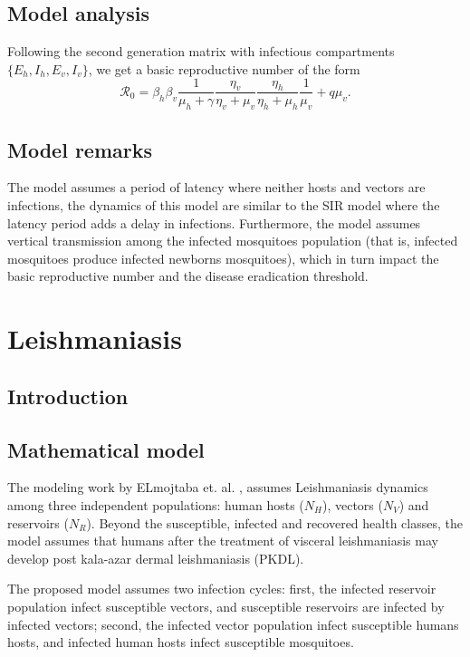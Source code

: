 \documentclass{book}\usepackage[]{graphicx}\usepackage[]{color}
\begin{document}
\subsection*{Model analysis}
Following the second generation matrix with infectious compartments $\{E_h,I_h,E_v,I_v\}$, we get a basic reproductive number of the form
\begin{equation}
    \mathcal{R}_0=\beta_{h} \beta_{v} \frac{1}{\mu_{h}+\gamma} \frac{\eta_{v}}{\eta_{v}+\mu_{v}} \frac{\eta_{h}}{\eta_{h}+\mu_{h}} \frac{1}{\mu_{v}}+q\mu_v.
\end{equation}

\subsection*{Model remarks}
The model assumes a period of latency where neither hosts and vectors are infections, the dynamics of this model are similar to the SIR model where the latency period adds a delay in infections. Furthermore, the model assumes vertical transmission among the infected mosquitoes population (that is, infected mosquitoes produce infected newborns mosquitoes), which in turn impact the basic reproductive number and the disease eradication threshold.

\section{Leishmaniasis}
%
\subsection*{Introduction}

\subsection*{Mathematical model}
The modeling work by ELmojtaba et. al. \cite{elmojtaba2010mathematical}, assumes Leishmaniasis dynamics among three independent populations: human hosts ($N_H$), vectors ($N_V$)  and reservoirs ($N_R$).
%
Beyond the susceptible, infected and recovered health classes, the model assumes that humans after the treatment of visceral leishmaniasis may develop post kala-azar dermal leishmaniasis (PKDL).

The proposed model assumes two infection cycles: first, the infected reservoir population infect susceptible vectors, and susceptible reservoirs are infected by infected vectors; second, the infected vector population infect susceptible humans hosts, and infected human hosts infect susceptible mosquitoes.
\end{document}
